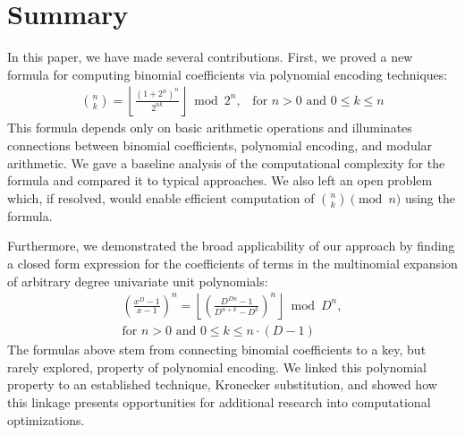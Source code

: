 \documentclass{article}
\theoremstyle{plain}
\theoremstyle{definition}
\begin{document}

\section{Summary}
In this paper, we have made several contributions. First, we proved a new formula for computing binomial coefficients via polynomial encoding techniques:
\begin{align*}
    \binom{n}{k} = \left\lfloor\frac{(1 + 2^{n})^{n}}{2^{n k}}\right\rfloor \bmod{2^{n}}\text{,} \quad \text{for } n > 0 \text{ and } 0 \leq k \leq n
\end{align*}
This formula depends only on basic arithmetic operations and illuminates connections between binomial coefficients, polynomial encoding, and modular arithmetic. We gave a baseline analysis of the computational complexity for the formula and compared it to typical approaches. We also left an open problem which, if resolved, would enable efficient computation of \(\binom{n}{k} \pmod{n}\) using the formula.

Furthermore, we demonstrated the broad applicability of our approach by finding a closed form expression for the coefficients of terms in the multinomial expansion of arbitrary degree univariate unit polynomials:
\begin{align*}
    [x^k] \left(\frac{x^{D}-1}{x-1}\right)^n = \left\lfloor \left(\frac{D^{Dn} - 1}{D^{n+k} - D^k}\right)^n\right\rfloor \bmod D^n, \\ \text{for } n > 0 \text{ and } 0 \leq k \leq n \cdot (D-1)
\end{align*}
The formulas above stem from connecting binomial coefficients to a key, but rarely explored, property of polynomial encoding. We linked this polynomial property to an established technique, Kronecker substitution, and showed how this linkage presents opportunities for additional research into computational optimizations.

\begingroup
\raggedright


\endgroup
\end{document}
